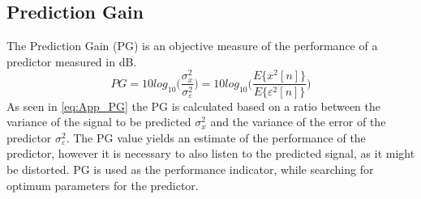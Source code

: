 \subsection{Prediction Gain}
The Prediction Gain (PG) is an objective measure of the performance of a predictor measured in dB. 
\begin{equation}\label{eq:App_PG}
PG = 10 log_{10}\bigg(\frac{\sigma^2_x}{\sigma^2_\varepsilon}\bigg) = 10 log_{10}\bigg(\frac{E\{x^2[n]\}}{E\{\varepsilon^2[n]\}}\bigg)
\end{equation}
As seen in \autoref{eq:App_PG} the PG is calculated based on a ratio between the variance of the signal to be predicted $\sigma^2_x$ and the variance of the error of the predictor $\sigma^2_\varepsilon$. The PG value yields an estimate of the performance of the predictor, however it is necessary to also listen to the predicted signal, as it might be distorted. PG is used as the performance indicator, while searching for optimum parameters for the predictor.  


%	

%	





















